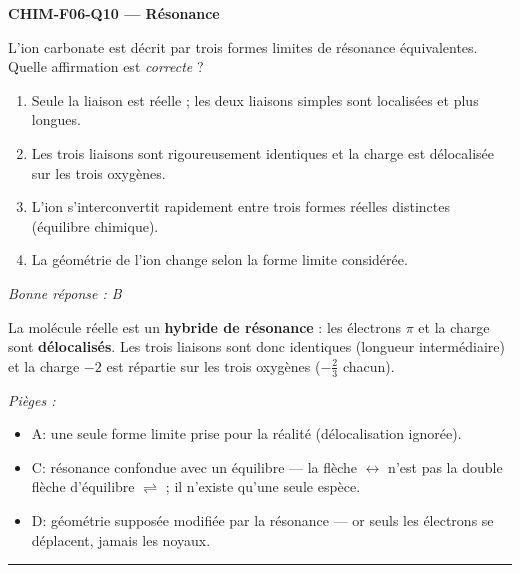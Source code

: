 \documentclass[11pt,a4paper]{article}
\begin{document}
\noindent\textbf{CHIM-F06-Q10 --- Résonance}\par
L'ion carbonate  est décrit par trois formes limites de résonance équivalentes. Quelle
affirmation est \emph{correcte} ?
\begin{enumerate}[label=\Alph*)]
\item Seule la liaison  est réelle ; les deux liaisons  simples sont localisées et plus longues.
\item Les trois liaisons  sont rigoureusement identiques et la charge est délocalisée sur les trois oxygènes.
\item L'ion s'interconvertit rapidement entre trois formes réelles distinctes (équilibre chimique).
\item La géométrie de l'ion change selon la forme limite considérée.
\end{enumerate}
\textit{Bonne réponse : B}\par
La molécule réelle est un \textbf{hybride de résonance} : les électrons $\pi$ et la charge sont
\textbf{délocalisés}. Les trois liaisons  sont donc identiques (longueur intermédiaire) et la
charge $-2$ est répartie sur les trois oxygènes ($-\tfrac{2}{3}$ chacun).\par
\textit{Pièges :}
\begin{itemize}
\item A: une seule forme limite prise pour la réalité (délocalisation ignorée).
\item C: résonance confondue avec un équilibre --- la flèche $\leftrightarrow$ n'est pas la double flèche d'équilibre $\rightleftharpoons$ ; il n'existe qu'une seule espèce.
\item D: géométrie supposée modifiée par la résonance --- or seuls les électrons se déplacent, jamais les noyaux.
\end{itemize}
\vspace{8pt}\hrule\vspace{8pt}
\end{document}
